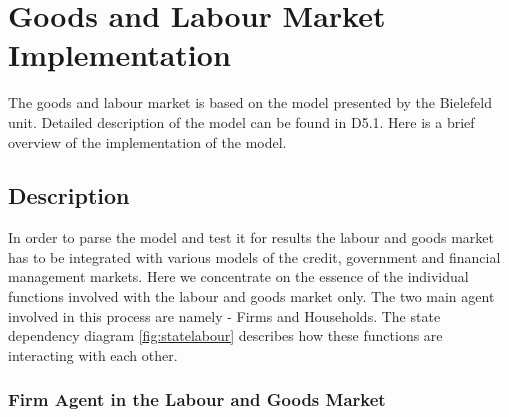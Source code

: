 \section{Goods and Labour Market Implementation}
The goods and labour market is based on the model presented by the
Bielefeld unit. Detailed description of the model can be found in
D5.1. Here is a brief overview of the implementation of the model.
\subsection{Description}
In order to parse the model and test it for results the labour and
goods market has to be integrated with various models of the credit,
government and financial management markets. Here we concentrate on
the essence of the individual functions involved with the labour and
goods market only. The two main agent involved in this process are
namely - Firms and Households. The state dependency diagram
\ref{fig:statelabour} describes how these functions are interacting
with each other.

\subsubsection{Firm Agent in the Labour and Goods Market}

